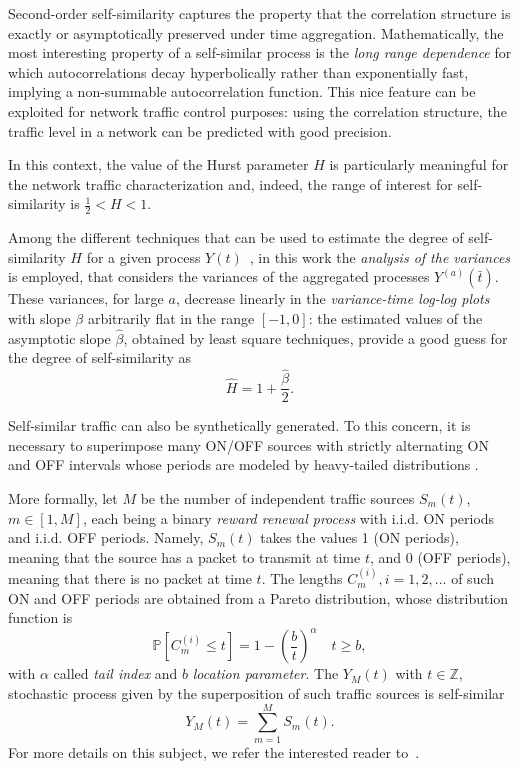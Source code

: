 \documentclass[journal,10pt,twoside,final]{IEEEtran}
\begin{document}
\vspace{0.3cm}

Second-order self-similarity captures the property that the correlation structure is exactly or asymptotically preserved under time aggregation. 
Mathematically, the most interesting property of a self-similar process is the \textit{long range dependence} for which autocorrelations decay hyperbolically rather than exponentially fast, implying a non-summable autocorrelation function. This nice feature can be exploited for network traffic control purposes: using the correlation structure, the traffic level in a network can be predicted with good precision.

In this context, the value of the Hurst parameter $H$ is particularly meaningful for the network traffic characterization and, indeed, the range of interest for self-similarity is $\frac{1}{2} < H < 1$. 

Among the different techniques that can be used to estimate the degree of self-similarity $H$ for a given process $Y(t)$~\cite{LelandTaqquWillinger94}, in this work the \textit{analysis of the variances} is employed, that considers the variances of the aggregated processes $Y^{(a)}(\bar t)$.
These variances, for large $a$, decrease linearly  in the \textit{variance-time log-log plots} with slope $\beta$ arbitrarily flat in the range $\left[-1,0\right]$: the estimated values of the asymptotic slope $\hat{\beta}$, obtained by least square techniques, provide a good guess for the degree of self-similarity as~\cite{LelandTaqquWillinger94} 
\begin{equation}
\hat{H} = 1 + \frac{\hat{\beta}}{2}.
\label{eq:hatH}
\end{equation}

Self-similar traffic can also be synthetically generated. To this concern, it is necessary to superimpose many ON/OFF sources with strictly alternating ON and OFF intervals whose periods are modeled by heavy-tailed distributions \cite{TaqquWillingerSherman97}.

More formally, let $M$ be the number of independent traffic sources $S_m(t)$, $m \in [1,M]$, each being a binary \textit{reward renewal process} with i.i.d. ON periods and i.i.d. OFF periods. Namely, $S_m(t)$ takes the values 1 (ON periods), meaning that the source has a packet to transmit at time $t$, and 0 (OFF periods), meaning that there is no packet at time $t$. The lengths $C_m^{(i)}, i=1,2,...$ of such ON and OFF periods are obtained from a Pareto distribution, whose distribution function is 
\begin{equation}
{\mathbb P}\left[C_m^{(i)} \leq t\right] = 1 - \left( \frac{b}{t} \right)^{\alpha} \quad  t \geq b,
\label{eq:pareto}
\end{equation}
with $\alpha$ called \emph{tail index} and $b$ \emph{location parameter}.
The $Y_M(t)$ with $t \in \mathbb{Z}$, stochastic process given by the superposition of such traffic sources is self-similar
\begin{equation}
Y_M(t) = \sum_{m=1}^M S_m(t).
\label{eq:sumS}
\end{equation} 
For more details on this subject, we refer the interested reader to~\cite{TaqquWillingerSherman97}.
\end{document}
